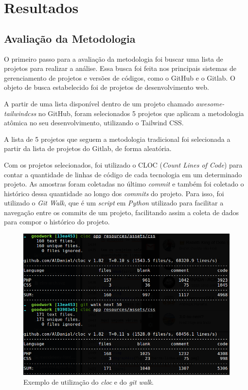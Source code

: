 \newpage

\hypertarget{resultados}{%
\chapter{Resultados}\label{resultados}}

\hypertarget{avaliacao}{%
\section{Avaliação da Metodologia}\label{avaliacao}}

O primeiro passo para a avaliação da metodologia foi buscar uma lista de projetos para realizar a análise. Essa busca foi feita nos principais sistemas de gerenciamento de projetos e versões de códigos, como o GitHub e o Gitlab. O objeto de busca estabelecido foi de projetos de desenvolvimento web.

A partir de uma lista disponível dentro de um projeto chamado \emph{awesome-tailwindcss}\nocite{githublist} no GitHub, foram selecionados 5 projetos que aplicam a metodologia atômica no seu desenvolvimento, utilizando o Tailwind CSS.

A lista de 5 projetos que seguem a metodologia tradicional foi selecionada a partir da lista de projetos do Gitlab, de forma aleatória.

Com os projetos selecionados, foi utilizado o CLOC (\emph{Count Lines of Code}) para contar a quantidade de linhas de código de cada tecnologia em um determinado projeto. As amostras foram coletadas no último \emph{commit} e também foi coletado o histórico dessa quantidade ao longo dos \emph{commits} do projeto. Para isso, foi utilizado o \emph{Git Walk}\nocite{gitwalk}, que é um \emph{script} em \emph{Python} utilizado para facilitar a navegação entre os commits de um projeto, facilitando assim a coleta de dados para compor o histórico do projeto.

\begin{figure}[H]
\centering
\includegraphics{figuras/cloc.png}
\caption{Exemplo de utilização do \emph{cloc} e do \emph{git walk}.}
\end{figure}

